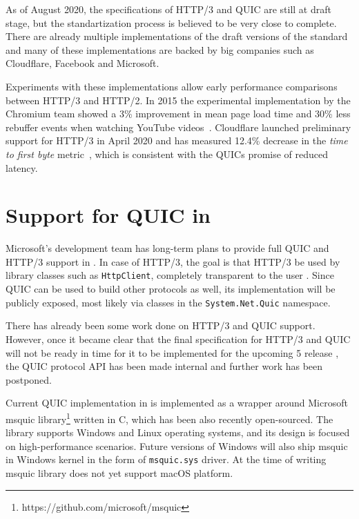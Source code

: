 As of August 2020, the specifications of HTTP/3 and QUIC are still at draft stage, but the
standartization process is believed to be very close to complete. There are already multiple
implementations of the draft versions of the standard and many of these implementations are backed
by big companies such as Cloudflare, Facebook and Microsoft.

Experiments with these implementations allow early performance comparisons between HTTP/3 and
HTTP/2. In 2015 the experimental implementation by the Chromium team showed a 3\% improvement in
mean page load time and 30\% less rebuffer events when watching YouTube videos~\cite{Wilk2015}.
Cloudflare launched preliminary support for HTTP/3 in April 2020 and has measured 12.4\% decrease in
the \textit{time to first byte} metric~\cite{Tellakula2020}, which is consistent with the QUICs
promise of reduced latency.

\section{Support for QUIC in \dotnet{}}

Microsoft's development team has long-term plans to provide full QUIC and HTTP/3 support in \dotnet{}.
In case of HTTP/3, the goal is that HTTP/3 be used by library classes such as \texttt{HttpClient},
completely transparent to the user . Since QUIC can be used to build other protocols as well, its
implementation will be publicly exposed, most likely via classes in the \texttt{System.Net.Quic}
namespace.

There has already been some work done on HTTP/3 and QUIC support. However, once it became clear that
the final specification for HTTP/3 and QUIC will not be ready in time for it to be implemented for
the upcoming \dotnet{} 5 release , the QUIC protocol API has been made internal and further work has
been postponed.




Current QUIC implementation in \dotnet{} is implemented as a wrapper around Microsoft msquic
library\footnote{https://github.com/microsoft/msquic}  written in C, which has been also recently
open-sourced. The library supports Windows and Linux operating systems, and its design is focused on
high-performance scenarios. Future versions of Windows will also ship msquic in  Windows kernel in
the form of \texttt{msquic.sys} driver. At the time of writing  msquic
library does not yet support macOS platform.

